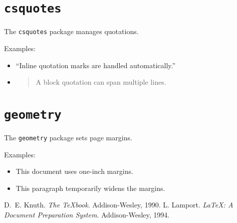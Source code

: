 \documentclass[12pt]{article}
\begin{document}
\section{\texttt{csquotes}}\label{sec:csquotes}
The \texttt{csquotes} package manages quotations.

Examples:
\begin{itemize}
  \item \enquote{Inline quotation marks are handled automatically.}
  \item \blockquote{A block quotation can span multiple lines.}
\end{itemize}

\section{\texttt{geometry}}\label{sec:geometry}
The \texttt{geometry} package sets page margins.

Examples:
\begin{itemize}
  \item This document uses one-inch margins.
  \item {}This paragraph temporarily widens the margins.\restoregeometry
\end{itemize}

\begin{thebibliography}{9}
 D.~E. Knuth. \emph{The TeXbook}. Addison-Wesley, 1990.
 L. Lamport. \emph{LaTeX: A Document Preparation System}. Addison-Wesley, 1994.
\end{thebibliography}
\end{document}
